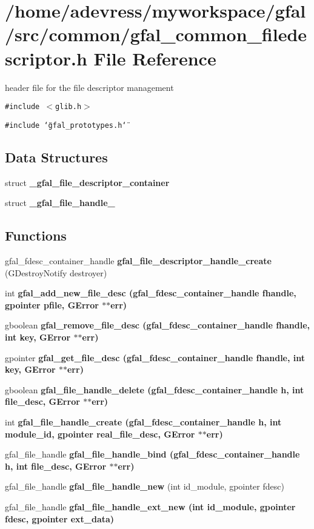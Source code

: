 \section{/home/adevress/myworkspace/gfal/src/common/gfal\_\-common\_\-filedescriptor.h File Reference}
\label{gfal__common__filedescriptor_8h}
header file for the file descriptor management 

{\tt \#include $<$glib.h$>$}\par
{\tt \#include \char`\"{}gfal\_\-prototypes.h\char`\"{}}\par
\subsection*{Data Structures}
\begin{CompactItemize}
\item 
struct \textbf{\_\-gfal\_\-file\_\-descriptor\_\-container}
\item 
struct \textbf{\_\-gfal\_\-file\_\-handle\_\-}
\end{CompactItemize}
\subsection*{Functions}
\begin{CompactItemize}
\item 
gfal\_\-fdesc\_\-container\_\-handle \textbf{gfal\_\-file\_\-descriptor\_\-handle\_\-create} (GDestroy\-Notify destroyer)\label{gfal__common__filedescriptor_8h_13934d51ad328aabb0721ef7793ad233}

\item 
int \bf{gfal\_\-add\_\-new\_\-file\_\-desc} (gfal\_\-fdesc\_\-container\_\-handle fhandle, gpointer pfile, GError $\ast$$\ast$err)
\item 
gboolean \bf{gfal\_\-remove\_\-file\_\-desc} (gfal\_\-fdesc\_\-container\_\-handle fhandle, int key, GError $\ast$$\ast$err)
\item 
gpointer \bf{gfal\_\-get\_\-file\_\-desc} (gfal\_\-fdesc\_\-container\_\-handle fhandle, int key, GError $\ast$$\ast$err)
\item 
gboolean \bf{gfal\_\-file\_\-handle\_\-delete} (gfal\_\-fdesc\_\-container\_\-handle h, int file\_\-desc, GError $\ast$$\ast$err)
\item 
int \bf{gfal\_\-file\_\-handle\_\-create} (gfal\_\-fdesc\_\-container\_\-handle h, int module\_\-id, gpointer real\_\-file\_\-desc, GError $\ast$$\ast$err)
\item 
gfal\_\-file\_\-handle \bf{gfal\_\-file\_\-handle\_\-bind} (gfal\_\-fdesc\_\-container\_\-handle h, int file\_\-desc, GError $\ast$$\ast$err)
\item 
gfal\_\-file\_\-handle \textbf{gfal\_\-file\_\-handle\_\-new} (int id\_\-module, gpointer fdesc)\label{gfal__common__filedescriptor_8h_9d05f277c63dea4b06fb518237a5da11}

\item 
gfal\_\-file\_\-handle \bf{gfal\_\-file\_\-handle\_\-ext\_\-new} (int id\_\-module, gpointer fdesc, gpointer ext\_\-data)
\end{CompactItemize}


